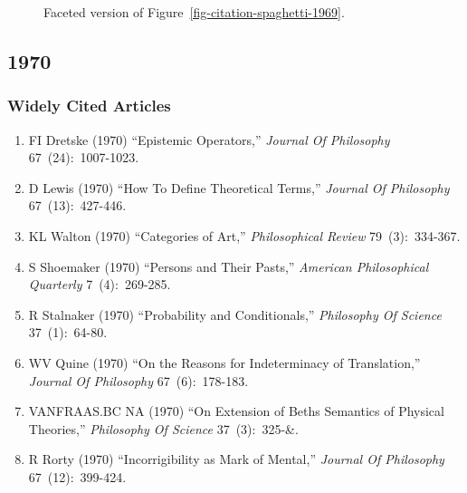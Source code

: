 \documentclass[
  10pt,
  letterpaper,
  DIV=11,
  numbers=noendperiod,
  twoside]{scrartcl}
\providecommand{\tightlist}{%
  \setlength{\itemsep}{0pt}\setlength{\parskip}{0pt}}\usepackage{longtable,booktabs,array}
\begin{document}
\begin{figure}


\caption{\label{fig-citation-facet-1969}Faceted version of
Figure~\ref{fig-citation-spaghetti-1969}.}

\end{figure}%

\newpage

\subsection{1970}\label{sec-s1970}

\subsubsection*{Widely Cited Articles}\label{widely-cited-articles-14}

\begin{enumerate}
\def\labelenumi{\arabic{enumi}.}
\tightlist
\item
  FI Dretske (1970) ``Epistemic Operators,'' \emph{Journal Of
  Philosophy} 67~(24):~1007-1023.
\item
  D Lewis (1970) ``How To Define Theoretical Terms,'' \emph{Journal Of
  Philosophy} 67~(13):~427-446.
\item
  KL Walton (1970) ``Categories of Art,'' \emph{Philosophical Review}
  79~(3):~334-367.
\item
  S Shoemaker (1970) ``Persons and Their Pasts,'' \emph{American
  Philosophical Quarterly} 7~(4):~269-285.
\item
  R Stalnaker (1970) ``Probability and Conditionals,'' \emph{Philosophy
  Of Science} 37~(1):~64-80.
\item
  WV Quine (1970) ``On the Reasons for Indeterminacy of Translation,''
  \emph{Journal Of Philosophy} 67~(6):~178-183.
\item
  VANFRAAS.BC NA (1970) ``On Extension of Beths Semantics of Physical
  Theories,'' \emph{Philosophy Of Science} 37~(3):~325-\&.
\item
  R Rorty (1970) ``Incorrigibility as Mark of Mental,'' \emph{Journal Of
  Philosophy} 67~(12):~399-424.
\end{enumerate}
\end{document}
